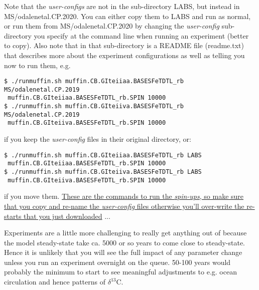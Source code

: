 \documentclass[11pt,fleqn]{book} %
\begin{document}
Note that the \textit{user-configs} are not in the sub-directory \textsf{\footnotesize LABS}, but instead in \textsf{\footnotesize MS/odalenetal.CP.2020}. You can either copy them to \textsf{\footnotesize LABS} and run as normal, or run them from \textsf{\footnotesize MS/odalenetal.CP.2020} by changing the \textit{user-config} sub-directory you specify at the command line when running an experiment (better to copy). Also note that in that sub-directory is a README file (\textsf{\footnotesize readme.txt}) that describes more about the experiment configurations as well as telling you now to run them, e.g.
\small\vspace{-2pt}\begin{verbatim}
$ ./runmuffin.sh muffin.CB.GIteiiaa.BASESFeTDTL_rb MS/odalenetal.CP.2019
 muffin.CB.GIteiiaa.BASESFeTDTL_rb.SPIN 10000
$ ./runmuffin.sh muffin.CB.GIteiiva.BASESFeTDTL_rb MS/odalenetal.CP.2019
 muffin.CB.GIteiiva.BASESFeTDTL_rb.SPIN 10000
\end{verbatim}\vspace{-2pt}\normalsize
if you keep the \textit{user-config} files in their original directory, or:
\small\vspace{-2pt}\begin{verbatim}
$ ./runmuffin.sh muffin.CB.GIteiiaa.BASESFeTDTL_rb LABS
 muffin.CB.GIteiiaa.BASESFeTDTL_rb.SPIN 10000
$ ./runmuffin.sh muffin.CB.GIteiiva.BASESFeTDTL_rb LABS
 muffin.CB.GIteiiva.BASESFeTDTL_rb.SPIN 10000
\end{verbatim}\vspace{-2pt}\normalsize
if you move them. \uline{These are the commands to run the \textit{spin-ups}, so make sure that you copy and re-name the \textit{user-config} files otherwise you'll over-write the re-starts that you just downloaded} ...

Experiments are a little more challenging to really get anything out of because the model steady-state take ca. 5000 or so years to come close to steady-state. Hence it is unlikely that you will see the full impact of any parameter change unless you run an experiment overnight on the queue. 50-100 years would probably the minimum to start to see meaningful adjustments to e.g. ocean circulation and hence patterns of $\delta^{13}$C.
\end{document}
